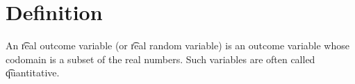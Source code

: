 
\section*{Definition}

An \t{real outcome variable} (or \t{real random variable}) is an outcome variable whose codomain is a subset of the real numbers.
Such variables are often called \t{quantitative}.

\blankpage